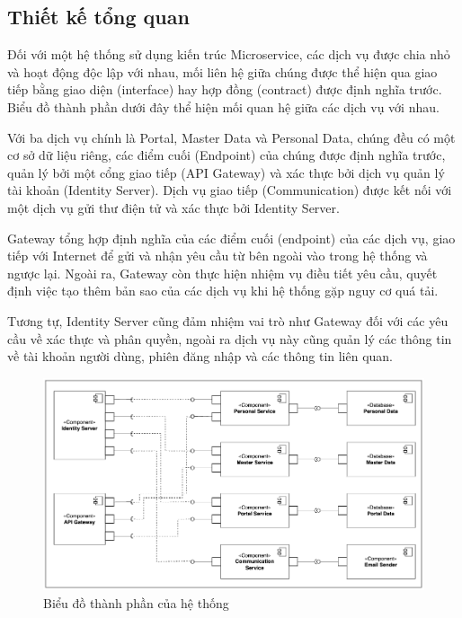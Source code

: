 \documentclass[../DoAn.tex]{subfiles}
\begin{document}
\subsection{Thiết kế tổng quan}
\label{subsection:4.1.2}
Đối với một hệ thống sử dụng kiến trúc Microservice, các dịch vụ được chia nhỏ và hoạt động độc lập với nhau, mối liên hệ giữa chúng được thể hiện qua giao tiếp bằng giao diện (interface)
hay hợp đồng (contract) được định nghĩa trước. Biểu đồ thành phần dưới đây thể hiện mối quan hệ giữa các dịch vụ với nhau.

Với ba dịch vụ chính là Portal, Master Data và Personal Data,
chúng đều có một cơ sở dữ liệu riêng, các điểm cuối (Endpoint) của chúng được định nghĩa trước, quản lý bởi một cổng giao tiếp (API Gateway) và xác thực bởi dịch vụ quản lý tài khoản (Identity Server).
Dịch vụ giao tiếp (Communication) được kết nối với một dịch vụ gửi thư điện tử và xác thực bởi Identity Server.

Gateway tổng hợp định nghĩa của các điểm cuối (endpoint) của các dịch vụ, giao tiếp với Internet để gửi và nhận yêu cầu từ bên ngoài vào trong hệ thống và ngược lại. Ngoài ra,
Gateway còn thực hiện nhiệm vụ điều tiết yêu cầu, quyết định việc tạo thêm bản sao của các dịch vụ khi hệ thống gặp nguy cơ quá tải.

Tương tự, Identity Server cũng đảm nhiệm vai trò như Gateway đối với các yêu cầu về xác thực và phân quyền, ngoài ra dịch vụ này cũng quản lý các thông tin về tài khoản người dùng,
phiên đăng nhập và các thông tin liên quan.

\begin{figure}[H]
    \centering
    \includegraphics[width=1.0\linewidth]{Hinhve/General_ComponentDiagram.png}
    \caption{Biểu đồ thành phần của hệ thống}
    \label{fig:General_ComponentDiagram}
\end{figure}
\newpage
\end{document}
